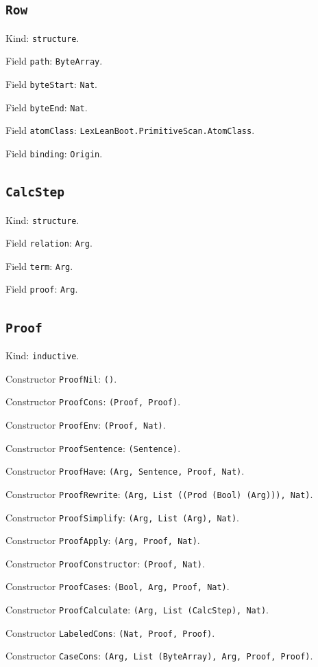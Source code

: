 \documentclass[11pt]{article}
\begin{document}
\subsection*{\texttt{Row}}
\noindent Kind: \texttt{structure}.\par
\noindent Field \texttt{path}: \texttt{ByteArray}.\par
\noindent Field \texttt{byteStart}: \texttt{Nat}.\par
\noindent Field \texttt{byteEnd}: \texttt{Nat}.\par
\noindent Field \texttt{atomClass}: \texttt{LexLeanBoot.PrimitiveScan.AtomClass}.\par
\noindent Field \texttt{binding}: \texttt{Origin}.\par
\subsection*{\texttt{CalcStep}}
\noindent Kind: \texttt{structure}.\par
\noindent Field \texttt{relation}: \texttt{Arg}.\par
\noindent Field \texttt{term}: \texttt{Arg}.\par
\noindent Field \texttt{proof}: \texttt{Arg}.\par
\subsection*{\texttt{Proof}}
\noindent Kind: \texttt{inductive}.\par
\noindent Constructor \texttt{ProofNil}: \texttt{()}.\par
\noindent Constructor \texttt{ProofCons}: \texttt{(Proof, Proof)}.\par
\noindent Constructor \texttt{ProofEnv}: \texttt{(Proof, Nat)}.\par
\noindent Constructor \texttt{ProofSentence}: \texttt{(Sentence)}.\par
\noindent Constructor \texttt{ProofHave}: \texttt{(Arg, Sentence, Proof, Nat)}.\par
\noindent Constructor \texttt{ProofRewrite}: \texttt{(Arg, List ((Prod (Bool) (Arg))), Nat)}.\par
\noindent Constructor \texttt{ProofSimplify}: \texttt{(Arg, List (Arg), Nat)}.\par
\noindent Constructor \texttt{ProofApply}: \texttt{(Arg, Proof, Nat)}.\par
\noindent Constructor \texttt{ProofConstructor}: \texttt{(Proof, Nat)}.\par
\noindent Constructor \texttt{ProofCases}: \texttt{(Bool, Arg, Proof, Nat)}.\par
\noindent Constructor \texttt{ProofCalculate}: \texttt{(Arg, List (CalcStep), Nat)}.\par
\noindent Constructor \texttt{LabeledCons}: \texttt{(Nat, Proof, Proof)}.\par
\noindent Constructor \texttt{CaseCons}: \texttt{(Arg, List (ByteArray), Arg, Proof, Proof)}.\par
\end{document}
